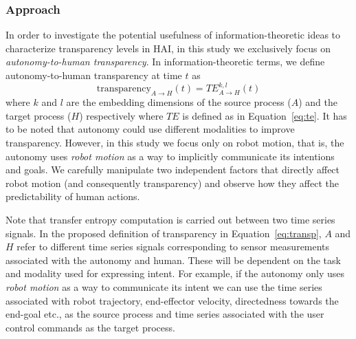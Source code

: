 \documentclass[12pt]{article}
\begin{document}
\subsubsection{Approach}
In order to investigate the potential usefulness of information-theoretic ideas to characterize transparency levels in HAI, in this study we exclusively focus on \textit{autonomy-to-human transparency}. In information-theoretic terms, we define autonomy-to-human transparency at time $t$ as
\begin{equation}\label{eq:transp}
\text{transparency}_{A \rightarrow H}(t) = TE_{A \rightarrow H}^{k,l}(t)
\end{equation}
where $k$ and $l$ are the embedding dimensions of the source process ($A$) and the target process ($H$) respectively where $TE$ is defined as in Equation~\ref{eq:te}. 
It has to be noted that autonomy could use different modalities to improve transparency. However, in this study we focus only on robot motion, that is, the autonomy uses \textit{robot motion} as a way to implicitly communicate its intentions and goals. We carefully manipulate two independent factors that directly affect robot motion (and consequently transparency) and observe how they affect the predictability of human actions. 

Note that transfer entropy computation is carried out between two time series signals. In the proposed definition of transparency in Equation~\ref{eq:transp}, $A$ and $H$ refer to different time series signals corresponding to sensor measurements associated with the autonomy and human. These will be dependent on the task and modality used for expressing intent. For example, if the autonomy only uses \textit{robot motion} as a way to communicate its intent we can use the time series associated with robot trajectory, end-effector velocity, directedness towards the end-goal etc., as the source process and time series associated with the user control commands as the target process.
%
%
%
%
\end{document}
